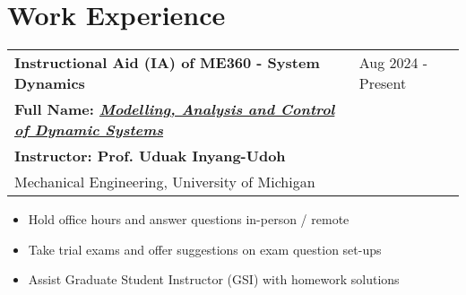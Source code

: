 \documentclass[letter,12pt]{article}
\begin{document}


\section{Work Experience}

\begin{tabularx}{\linewidth}{@{}l X@{}}
\large \textbf{Instructional Aid (IA) of ME360 - System Dynamics} & \hfill {Aug 2024 - Present} \\
\normalsize \textbf{Full Name: \href{https://me.engin.umich.edu/wp-content/uploads/2023/07/ME-360-Course-Profile.pdf}{\textit{Modelling, Analysis and Control of Dynamic Systems}}} & \hfill \small{} \\
\small \textbf{Instructor: Prof. Uduak Inyang-Udoh} & \hfill \small{} \\
\normalsize{Mechanical Engineering, University of Michigan} & \hfill \small{} \\
\end{tabularx}

\begin{itemize}[
    rightmargin=2cm
]
    \setlength{\itemsep}{1pt}
    \setlength{\parskip}{0pt}
    \setlength{\parsep}{0pt}
    \item{\small Hold office hours and answer questions in-person / remote}
    \item{\small Take trial exams and offer suggestions on exam question set-ups}
    \item{\small Assist Graduate Student Instructor (GSI) with homework solutions}

\end{itemize}
        
\end{document}
